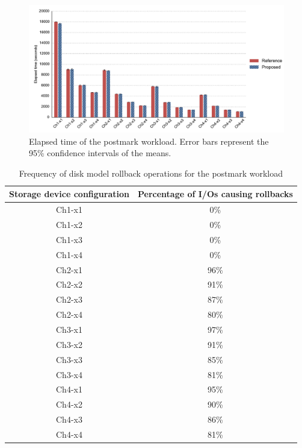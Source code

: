 \begin{figure}[htpb]
	\centering
	\includegraphics[width=\textwidth]{figures/ch6-fig-10.pdf}
	\caption[Elapsed time of the postmark workload.]{\label{fig:ch6-fig-10}Elapsed time of the postmark workload. Error bars represent the 95\% confidence intervals of the means.}
\end{figure}

\begin{table}[htbp]%
	\centering
	\caption{Frequency of disk model rollback operations for the postmark workload}\label{tab:ch6-6-rollback}
	\noindent\begin{tabular}{cc}
		\toprule
		Storage device configuration &
		Percentage of I/Os causing rollbacks \\
		\midrule
		Ch1-x1 & 0\% \\
		Ch1-x2 & 0\% \\
		Ch1-x3 & 0\% \\
		Ch1-x4 & 0\% \\
		Ch2-x1 & 96\% \\
		Ch2-x2 & 91\% \\
		Ch2-x3 & 87\% \\
		Ch2-x4 & 80\% \\
		Ch3-x1 & 97\% \\
		Ch3-x2 & 91\% \\
		Ch3-x3 & 85\% \\
		Ch3-x4 & 81\% \\
		Ch4-x1 & 95\% \\
		Ch4-x2 & 90\% \\
		Ch4-x3 & 86\% \\
		Ch4-x4 & 81\% \\
		\bottomrule
	\end{tabular}
\end{table}%

